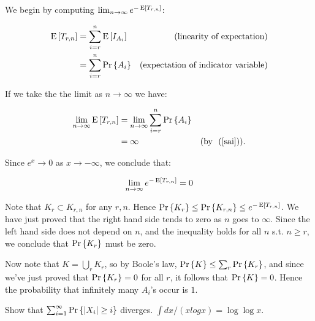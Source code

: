 \documentclass[11pt]{article}
\begin{document}
\begin{problem}
\begin{problemparts}
{We begin by computing $\lim_{n \to \infty} e^{-\mathop{\textup{E}}\nolimits\left[T_{r,n}\right]}$:

\begin{align*}
\mathop{\textup{E}}\nolimits\left[T_{r,n}\right] & = \sum_{i=r}^n \mathop{\textup{E}}\nolimits\left[I_{A_i}\right]
         &\text{(linearity of expectation)} \\
  & = \sum_{i=r}^n \mathop{\textup{Pr}}\nolimits\left\{A_i\right\} & \text{(expectation of indicator
         variable)}
\end{align*}

If we take the the limit as $n \to \infty$ we have:

\begin{align*}
\lim_{n \to \infty}\mathop{\textup{E}}\nolimits\left[T_{r,n}\right] & = \lim_{n \to \infty}\sum_{i=r}^n \mathop{\textup{Pr}}\nolimits\left\{A_i\right\} \\
	& = \infty & \text{(by ~(\ref{sai}))}. 
\end{align*}

Since $e^x \to 0$ as $x \to -\infty$, we conclude that:

\begin{align*}
\lim_{n \to \infty} e^{-\mathop{\textup{E}}\nolimits\left[T_{r,n}\right]} = 0
\end{align*}

Note that $K_r \subset K_{r,n}$ for any $r, n$.  Hence $\mathop{\textup{Pr}}\nolimits\left\{K_r\right\}
\leq \mathop{\textup{Pr}}\nolimits\left\{K_{r,n}\right\} \leq e^{-\mathop{\textup{E}}\nolimits\left[T_{r,n}\right]}$.  We have just
proved that the right hand side tends to zero as $n$ goes to $\infty$.
Since the left hand side does not depend on $n$, and the inequality
holds for all $n$ s.t. $n \geq r$, we conclude that $\mathop{\textup{Pr}}\nolimits\left\{K_r\right\}$
must be zero.

Now note that $K = \bigcup_r K_r$, so by Boole's law, $\mathop{\textup{Pr}}\nolimits\left\{K\right\} \leq
\sum_r \mathop{\textup{Pr}}\nolimits\left\{K_r\right\}$, and since we've just proved that $\mathop{\textup{Pr}}\nolimits\left\{K_r\right\} = 0$ for
all $r$, it follows that $\mathop{\textup{Pr}}\nolimits\left\{K\right\} = 0$. Hence the probability that
infinitely many $A_i$'s occur is $1$.  }

\problempart\label{divsum}
Show that
$\sum_{i=1}^\infty\mathop{\textup{Pr}}\nolimits\left\{\left|X_i\right|\geq i\right\}$ diverges.  \hint $\int dx/(x
log x) = \log\log x$.



\end{problemparts}
\end{problem}
\end{document}
